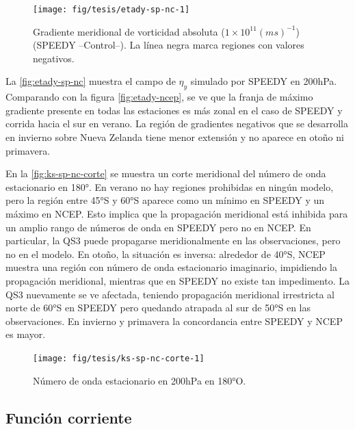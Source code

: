 \documentclass[spanish,a4paper,12pt,oneside]{book}
\begin{document}
\begin{landscape}\begin{figure}

{\centering \texttt{[image: fig/tesis/etady-sp-nc-1]} 

}

\caption{Gradiente meridional de vorticidad absoluta ($1\times10^{11}(ms)^{-1}$) (SPEEDY --Control--). La línea negra marca regiones con valores negativos.}\label{fig:etady-sp-nc}
\end{figure}
\end{landscape}

La \autoref{fig:etady-sp-nc} muestra el campo de \(\eta_{y}\) simulado
por SPEEDY en 200hPa. Comparando con la figura \autoref{fig:etady-ncep},
se ve que la franja de máximo gradiente presente en todas las estaciones
es más zonal en el caso de SPEEDY y corrida hacia el sur en verano. La
región de gradientes negativos que se desarrolla en invierno sobre Nueva
Zelanda tiene menor extensión y no aparece en otoño ni primavera.

En la \autoref{fig:ks-sp-nc-corte} se muestra un corte meridional del
número de onda estacionario en 180°. En verano no hay regiones
prohibidas en ningún modelo, pero la región entre 45°S y 60°S aparece
como un mínimo en SPEEDY y un máximo en NCEP. Esto implica que la
propagación meridional está inhibida para un amplio rango de números de
onda en SPEEDY pero no en NCEP. En particular, la QS3 puede propagarse
meridionalmente en las observaciones, pero no en el modelo. En otoño, la
situación es inversa: alrededor de 40°S, NCEP muestra una región con
número de onda estacionario imaginario, impidiendo la propagación
meridional, mientras que en SPEEDY no existe tan impedimento. La QS3
nuevamente se ve afectada, teniendo propagación meridional irrestricta
al norte de 60°S en SPEEDY pero quedando atrapada al sur de 50°S en las
observaciones. En invierno y primavera la concordancia entre SPEEDY y
NCEP es mayor.

\begin{figure}
\texttt{[image: fig/tesis/ks-sp-nc-corte-1]} \caption{Número de onda estacionario en 200hPa en 180°O.}\label{fig:ks-sp-nc-corte}
\end{figure}

\hypertarget{funcion-corriente-1}{%
\subsection{Función corriente}\label{funcion-corriente-1}}
\end{document}
